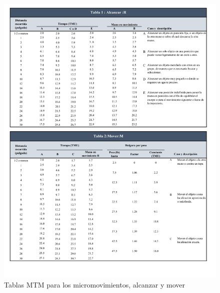     
    \begin{figure}[H]
        \centering
        \includegraphics[trim = {5mm 5mm 5mm 5mm},clip,scale=0.35]{22/Img/tablasMTM1.pdf}
        \caption{Tablas MTM para los micromovimientos, alcanzar y mover}
        \label{tablaMTM1}
    \end{figure}
    
